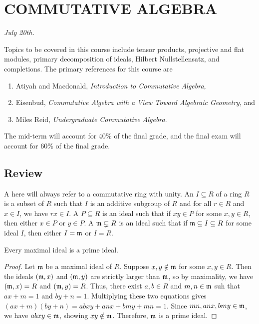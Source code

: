 \chapter{COMMUTATIVE ALGEBRA}

\textit{July 20th.}

Topics to be covered in this course include tensor products, projective and flat modules, primary decomposition of ideals, Hilbert Nullstellensatz, and completions. The primary references for this course are
\begin{enumerate}
    \item Atiyah and Macdonald, \emph{Introduction to Commutative Algebra},
    \item Eisenbud, \emph{Commutative Algebra with a View Toward Algebraic Geometry}, and
    \item Miles Reid, \emph{Undergraduate Commutative Algebra}.
\end{enumerate}
The mid-term will account for 40\% of the final grade, and the final exam will account for 60\% of the final grade.

\section{Review}
A  here will always refer to a commutative ring with unity. An  $I \subseteq R$ of a ring $R$ is a subset of $R$ such that $I$ is an additive subgroup of $R$ and for all $r \in R$ and $x \in I$, we have $rx \in I$. A  $P \subseteq R$ is an ideal such that if $xy \in P$ for some $x, y \in R$, then either $x \in P$ or $y \in P$. A  $\mathfrak{m} \subsetneq R$ is an ideal such that if $\mathfrak{m} \subseteq I \subseteq R$ for some ideal $I$, then either $I = \mathfrak{m}$ or $I = R$.

\begin{proposition}
    Every maximal ideal is a prime ideal.
\end{proposition}
\begin{proof}
    Let $\mathfrak{m}$ be a maximal ideal of $R$. Suppose $x,y \notin \mathfrak{m}$ for some $x,y \in R$. Then the ideals $(\mathfrak{m}, x)$ and $(\mathfrak{m}, y)$ are strictly larger than $\mathfrak{m}$, so by maximality, we have $(\mathfrak{m}, x) = R$ and $(\mathfrak{m}, y) = R$. Thus, there exist $a,b \in R$ and $m,n \in \mathfrak{m}$ suh that $ax + m = 1$ and $by + n = 1$. Multiplying these two equations gives $(ax+m)(by+n) = abxy + anx + bmy + mn = 1$. Since $mn, anx, bmy \in \mathfrak{m}$, we have $abxy \in \mathfrak{m}$, showing $xy \notin \mathfrak{m}$. Therefore, $\mathfrak{m}$ is a prime ideal.
\end{proof}

